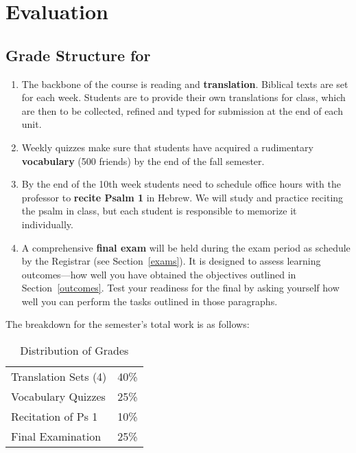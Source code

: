 \documentclass[titlepage]{article}
\begin{document}
\section{Evaluation}
\label{evaluation}

\subsection{Grade Structure for \ccode}
\label{structure}

\begin{enumerate}

 \item The backbone of the course is reading and \textbf{translation}.
 Biblical texts are set for each week. Students are to provide their own
 translations for class, which are then to be collected, refined and
 typed for submission at the end of each unit.

 \item Weekly quizzes make sure that students have acquired a
 rudimentary \textbf{vocabulary} (500 friends) by the end of the fall
 semester.

 \item By the end of the 10th week students need to schedule office
 hours with the professor to \textbf{recite Psalm 1} in Hebrew. We will
 study and practice reciting the psalm in class, but each student is
 responsible to memorize it individually.

 \item A comprehensive \textbf{final exam} will be held during the exam
 period as schedule by the Registrar (see Section~\ref{exams}). It is
 designed to assess learning outcomes---how well you have obtained the
 objectives outlined in Section~\ref{outcomes}. Test your readiness for
 the final by asking yourself how well you can perform the tasks
 outlined in those paragraphs.

\end{enumerate}

The breakdown for the semester's total work is as follows:

\begin{table}[htbp]
  \centering
  \begin{tabular}{lr}
    \toprule
    Translation Sets (4) & 40\% \\
    Vocabulary Quizzes   & 25\% \\
    Recitation of Ps 1  & 10\% \\
    Final Examination    & 25\% \\
    \bottomrule
  \end{tabular}
  \caption{Distribution of Grades}
  \label{distribution}
\end{table}
\end{document}
